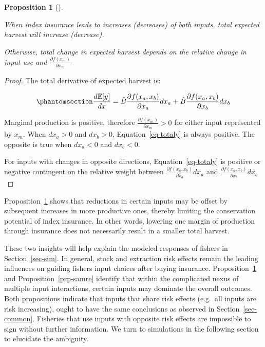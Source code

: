 \documentclass[
  letterpaper,
  DIV=11,
  numbers=noendperiod]{scrartcl}
\theoremstyle{plain}
\theoremstyle{plain}
\newtheorem{proposition}{Proposition}[section]
\theoremstyle{remark}
\begin{document}
\begin{proposition}[]\protect\hypertarget{prp-har}{}\label{prp-har}

When index insurance leads to increases (decreases) of both inputs,
total expected harvest will increase (decrease).

Otherwise, total change in expected harvest depends on the relative
change in input use and \(\frac{\partial f(x_m)}{\partial x_m}\)

\end{proposition}

\begin{proof}
The total derivative of expected harvest is:

\begin{equation}\phantomsection\label{eq-totaly}{
\frac{d \mathbb{E}[y]}{dx}=\hat{B}\frac{\partial f(x_a,x_b)}{\partial x_a}dx_a+\hat{B}\frac{\partial f(x_a,x_b)}{\partial x_b}dx_b
}\end{equation}

Marginal production is positive, therefore
\(\frac{\partial f(x_m)}{\partial x_m}>0\) for either input represented
by \(x_m\). When \(dx_a>0\) and \(dx_b>0\), Equation~\ref{eq-totaly} is
always positive. The opposite is true when \(dx_a<0\) and \(dx_b<0\).

For inputs with changes in opposite directions, Equation~\ref{eq-totaly}
is positive or negative contingent on the relative weight between
\(\frac{\partial f(x_a,x_b)}{\partial x_a}dx_a\) and
\(\frac{\partial f(x_a,x_b)}{\partial x_b}dx_b\)
\end{proof}

Proposition~\ref{prp-har} shows that reductions in certain inputs may be
offset by subsequent increases in more productive ones, thereby limiting
the conservation potential of index insurance. In other words, lowering
one margin of production through insurance does not necessarily result
in a smaller total harvest.

These two insights will help explain the modeled responses of fishers in
Section~\ref{sec-sim}. In general, stock and extraction risk effects
remain the leading influences on guiding fishers input choices after
buying insurance. Proposition~\ref{prp-har} and
Proposition~\ref{prp-samre} identify that within the complicated nexus
of multiple input interactions, certain inputs may dominate the overall
outcomes. Both propositions indicate that inputs that share risk effects
(e.g.~all inputs are risk increasing), ought to have the same
conclusions as observed in Section~\ref{sec-common}. Fisheries that use
inputs with opposite risk effects are impossible to sign without further
information. We turn to simulations in the following section to
elucidate the ambiguity.
\end{document}
